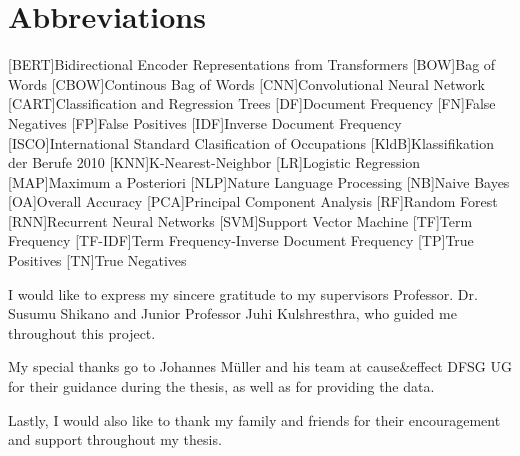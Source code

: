 \documentclass[12pt, a4paper, titlepage]{article}
\newenvironment{acknowledgments}{%
  \renewcommand*{\abstractname}{Acknowledgments} \abstract}{%
  \endabstract
}
\begin{document}
\section*{Abbreviations}
\begin{acronym}
  [BERT]{Bidirectional Encoder Representations from Transformers}
  [BOW]{Bag of Words}
  [CBOW]{Continous Bag of Words}
  [CNN]{Convolutional Neural Network}
  [CART]{Classification and Regression Trees}
  [DF]{Document Frequency}
  [FN]{False Negatives}
  [FP]{False Positives}
  [IDF]{Inverse Document Frequency}
  [ISCO]{International Standard Clasification of Occupations}
  [KldB]{Klassifikation der Berufe 2010}
  [KNN]{K-Nearest-Neighbor}
  [LR]{Logistic Regression}
  [MAP]{Maximum a Posteriori}
  [NLP]{Nature Language Processing}
  [NB]{Naive Bayes}
  [OA]{Overall Accuracy}
  [PCA]{Principal Component Analysis}
  [RF]{Random Forest}
  [RNN]{Recurrent Neural Networks}
  [SVM]{Support Vector Machine}
  [TF]{Term Frequency}
  [TF-IDF]{Term Frequency-Inverse Document Frequency}
  [TP]{True Positives}
  [TN]{True Negatives}
\end{acronym}
\newpage

\begin{acknowledgments}
I would like to express my sincere gratitude to my supervisors Professor. Dr. Susumu Shikano and Junior Professor Juhi Kulshresthra, who guided me throughout this project.

\bigskip

\noindent My special thanks go to Johannes Müller and his team at cause\&effect DFSG UG for their guidance during the thesis, as well as for providing the data.

\bigskip

\noindent Lastly, I would also like to thank my family and friends for their encouragement and support throughout my thesis. 
\end{acknowledgments}
\end{document}

